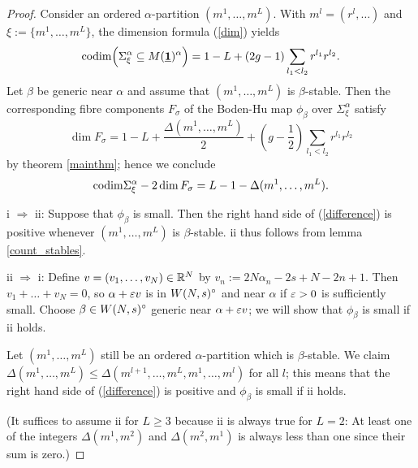 \documentclass{article}
\begin{document}
\begin{proof}
  Consider an ordered $\alpha$-partition $(m^1, \ldots, m^L)$. With $m^l = (r^l, \ldots)$ and $\xi := \{m^1, \ldots, m^L\}$, the dimension formula
  (\ref{dim}) yields
  \begin{displaymath}
    \mathrm{codim} \Big( \Sigma^{\alpha}_{\xi} \subseteq M(\underline{\mathbf{1}})^{\alpha} \Big) = 1 - L + (2g - 1) \sum_{l_1 < l_2} r^{l_1} r^{l_2}.
  \end{displaymath}
  Let $\beta$ be generic near $\alpha$ and assume that $(m^1, \ldots, m^L)$ is $\beta$-stable. Then the corresponding fibre components $F_{\sigma}$ of the
  Boden-Hu map $\phi_{\beta}$ over $\Sigma^{\alpha}_{\xi}$ satisfy
  \begin{displaymath}
    \dim F_{\sigma} = 1 - L + \frac{\Delta(m^1, \ldots, m^L)}{2} + \left(g - \frac{1}{2} \right) \sum_{l_1 < l_2} r^{l_1} r^{l_2}
  \end{displaymath}
  by theorem \ref{mainthm}; hence we conclude
  \begin{equation} \label{difference}
    \mathrm{codim} \Sigma^{\alpha}_{\xi} - 2 \dim F_{\sigma} = L - 1 - \Delta(m^1, \ldots, m^L).
  \end{equation}

  i $\Rightarrow$ ii: Suppose that $\phi_{\beta}$ is small. Then the right hand side of (\ref{difference}) is positive whenever $(m^1, \ldots, m^L)$ is
  $\beta$-stable. ii thus follows from lemma \ref{count_stables}.

  ii $\Rightarrow$ i: Define $v = (v_1, \ldots, v_N) \in \mathbb{R}^N$ by $v_n := 2N \alpha_n - 2s + N - 2n + 1$. Then $v_1 + \ldots + v_N = 0$, so $\alpha
  + \varepsilon v$ is in $W(N, s)^{\circ}$ and near $\alpha$ if $\varepsilon > 0$ is sufficiently small. Choose $\beta \in W(N, s)^{\circ}$ generic near $\alpha + \varepsilon v$; we
  will show that $\phi_{\beta}$ is small if ii holds.

  Let $(m^1, \ldots, m^L)$ still be an ordered $\alpha$-partition which is $\beta$-stable. We claim $\Delta(m^1, \ldots, m^L) \leq \Delta(m^{l+1}, \ldots,
  m^L, m^1, \ldots, m^l)$ for all $l$; this means that the right hand side of (\ref{difference}) is positive and $\phi_{\beta}$ is small if ii holds.

  (It suffices to assume ii for $L \geq 3$ because ii is always true for $L = 2$: At least one of the integers $\Delta(m^1, m^2)$ and $\Delta(m^2, m^1)$
  is always less than one since their sum is zero.)


\end{proof}
\end{document}
